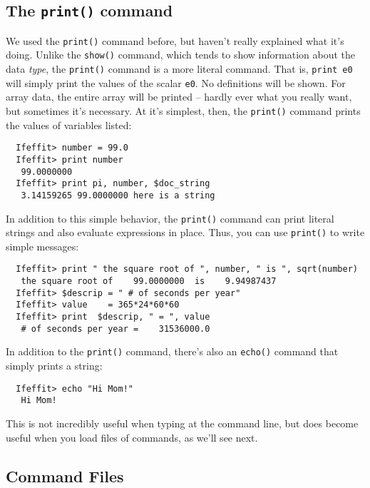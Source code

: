 \documentclass[11pt]{article}
\begin{document}
\subsection{The {\tt{print()}} command}
\label{s:datatypes:print}

We used the {\tt{print()}} command before, but haven't really explained
what it's doing. Unlike the {\tt{show()}} command, which tends to
show information about the data {\emph{type}}, the {\tt{print()}}
command is a more literal command.  That is, {\tt{print e0}} will simply
print the values of the scalar {\tt{e0}}.  No definitions will be shown.
For array data, the entire array will be printed -- hardly ever what you
really want, but sometimes it's necessary.  At it's simplest, then, the
{\tt{print()}} command prints the values of variables listed:

{\small\begin{verbatim} 
  Ifeffit> number = 99.0 
  Ifeffit> print number 
   99.0000000 
  Ifeffit> print pi, number, $doc_string 
   3.14159265 99.0000000 here is a string
\end{verbatim}
}\noindent %
In addition to this simple behavior, the {\tt{print()}} command can print
literal strings and also evaluate expressions in place.  Thus, you can use
{\tt{print()}} to write simple messages:
{\small\begin{verbatim}
  Ifeffit> print " the square root of ", number, " is ", sqrt(number)
   the square root of    99.0000000  is    9.94987437
  Ifeffit> $descrip = " # of seconds per year"
  Ifeffit> value    = 365*24*60*60
  Ifeffit> print  $descrip, " = ", value
   # of seconds per year =    31536000.0
\end{verbatim}
}\noindent
In addition to the {\tt{print()}} command, there's also an {\tt{echo()}}
command that simply prints a string:
{\small\begin{verbatim} 
  Ifeffit> echo "Hi Mom!"
   Hi Mom!
\end{verbatim}
}\noindent %
This is not incredibly useful when typing at the command line, but does
become useful when you load files of {\ifeffit} commands, as we'll see
next. 

\subsection{Command Files}
\label{s:datatypes:load}
\end{document}
